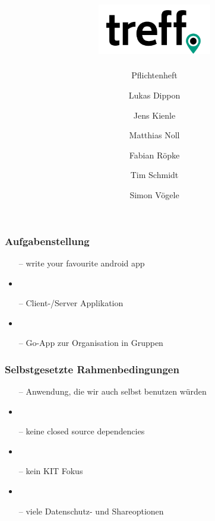 \documentclass[aspectratio=1610]{beamer}
\title{\includegraphics[width = 50mm]{images/logo_crop.png}}
\subtitle{\huge Pflichtenheft}
\author{Lukas Dippon
	\and Jens Kienle
	\and Matthias Noll
	\and Fabian Röpke
	\and Tim Schmidt
	\and Simon Vögele}
\begin{document}
	
	\begin{frame}[plain]
	\maketitle
	\end{frame}

	\begin{frame}[plain]
		\frametitle{Aufgabenstellung}
		\begin{itemize}
			\item[--] write your favourite android app
			\item
			\item [--]Client-/Server Applikation
			\item
			\item[--] Go-App zur Organisation in Gruppen
		\end{itemize}
	\end{frame}

	\begin{frame}[plain]
		\frametitle{Selbstgesetzte Rahmenbedingungen}
		\begin{itemize}
			\item[--] Anwendung, die wir auch  selbst benutzen würden
			\item
			\item[--] keine closed source dependencies
			\item
			\item [--]kein KIT Fokus
			\item
			\item [--]viele Datenschutz- und Shareoptionen
		\end{itemize}
	\end{frame}
\end{document}
